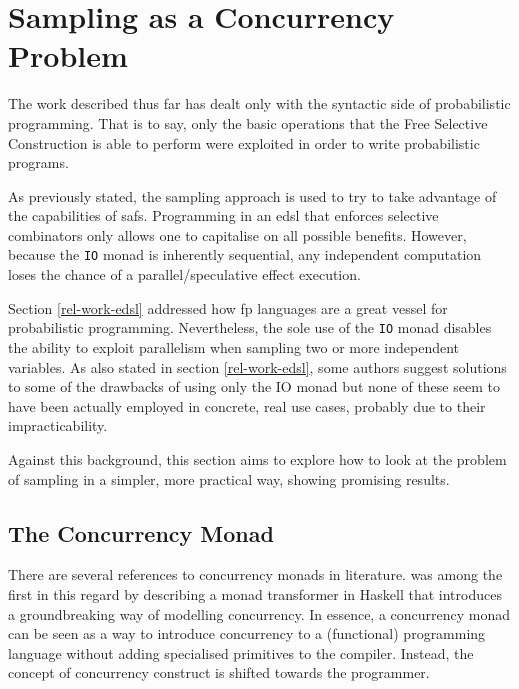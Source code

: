 \documentclass[
  oneside,
  11pt, a4paper,
  footinclude=true,
  headinclude=true,
  cleardoublepage=empty
]{scrbook}
\theoremstyle{definition}
\theoremstyle{definition}
\begin{document}
    \section{Sampling as a Concurrency Problem}\label{prob-conc}
    
    The work described thus far has dealt only with the syntactic side of probabilistic programming. That is to say, only the basic operations that the Free Selective Construction is able to perform were exploited in order to write probabilistic programs.
    
    As previously stated, the sampling approach is used to try to take advantage of the capabilities of \glspl{saf}. Programming in an \gls{edsl} that enforces selective combinators only allows one to capitalise on all possible benefits. However, because the \texttt{IO} monad is inherently sequential, any independent computation loses the chance of a parallel/speculative effect execution.
    
    Section \ref{rel-work-edsl} addressed how \gls{fp} languages are a great vessel for probabilistic programming. Nevertheless, the sole use of the \texttt{IO} monad disables the ability to exploit parallelism when sampling two or more independent variables. As also stated in section \ref{rel-work-edsl}, some authors suggest solutions to some of the drawbacks of using only the IO monad \citep{Scibior:2015:PPP:2887747.2804317, gordon2014probabilistic, jtobin} but none of these seem to have been actually employed in concrete, real use cases, probably due to their impracticability.
    
    Against this background, this section aims to explore how to look at the problem of sampling in a simpler, more practical way, showing promising results.
    
    \subsection{The Concurrency Monad}
    
    There are several references to concurrency monads in literature. \cite{Claessen1999FunctionalPA} was among the first in this regard by describing a monad transformer in Haskell that introduces a groundbreaking way of modelling concurrency. In essence, a concurrency monad can be seen as a way to introduce concurrency to a (functional) programming language without adding specialised primitives to the compiler. Instead, the concept of concurrency construct is shifted towards the programmer.
    
\end{document}

